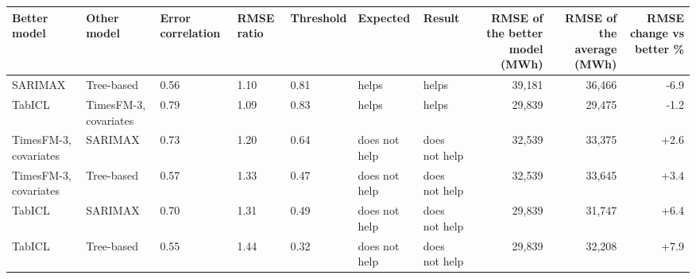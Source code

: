 \begin{tabular}{lllllllrrr}
\toprule
Better model & Other model & Error correlation & RMSE ratio & Threshold & Expected & Result & RMSE of the better model (MWh) & RMSE of the average (MWh) & RMSE change vs better \% \\
\midrule
SARIMAX & Tree-based & 0.56 & 1.10 & 0.81 & helps & helps & 39,181 & 36,466 & -6.9 \\
TabICL & TimesFM-3, covariates & 0.79 & 1.09 & 0.83 & helps & helps & 29,839 & 29,475 & -1.2 \\
TimesFM-3, covariates & SARIMAX & 0.73 & 1.20 & 0.64 & does not help & does not help & 32,539 & 33,375 & +2.6 \\
TimesFM-3, covariates & Tree-based & 0.57 & 1.33 & 0.47 & does not help & does not help & 32,539 & 33,645 & +3.4 \\
TabICL & SARIMAX & 0.70 & 1.31 & 0.49 & does not help & does not help & 29,839 & 31,747 & +6.4 \\
TabICL & Tree-based & 0.55 & 1.44 & 0.32 & does not help & does not help & 29,839 & 32,208 & +7.9 \\
\bottomrule
\end{tabular}
